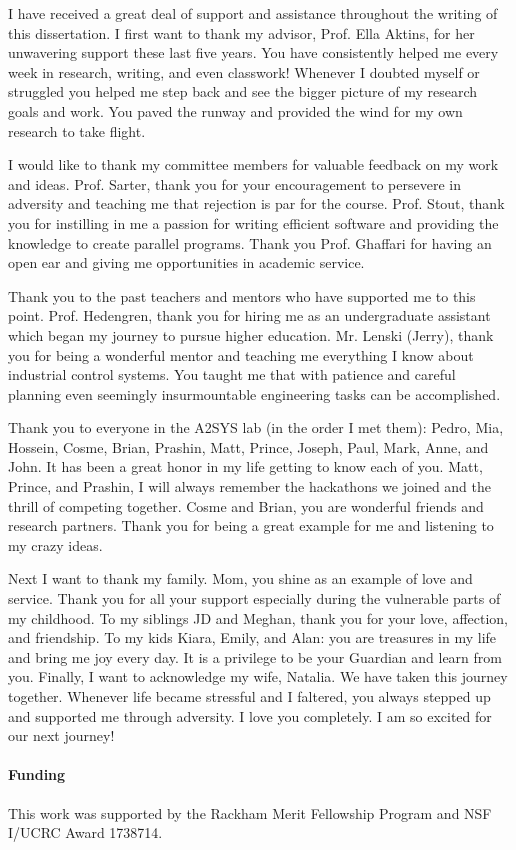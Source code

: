 I have received a great deal of support and assistance throughout the writing of this dissertation. I first want to thank my advisor, Prof. Ella Aktins, for her unwavering support these last five years. You have consistently helped me every week in research, writing, and even classwork! Whenever I doubted myself or struggled you helped me step back and see the bigger picture of my research goals and work. You paved the runway and provided the wind for my own research to take flight.

I would like to thank my committee members for valuable feedback on my work and ideas. Prof. Sarter, thank you for your encouragement to persevere in adversity and teaching me that rejection is par for the course. Prof. Stout, thank you for instilling in me a passion for writing efficient software and providing the knowledge to create parallel programs. Thank you Prof. Ghaffari for having an open ear and giving me opportunities in academic service.


Thank you to the past teachers and mentors who have supported me to this point. Prof. Hedengren, thank you for hiring me as an undergraduate assistant which began my journey to pursue higher education. Mr. Lenski (Jerry), thank you for being a wonderful mentor and teaching me everything I know about industrial control systems. You taught me that with patience and careful planning even seemingly insurmountable engineering tasks can be accomplished. 

Thank you to everyone in the A2SYS lab (in the order I met them): Pedro, Mia, Hossein, Cosme, Brian, Prashin, Matt, Prince, Joseph, Paul, Mark, Anne, and John.  It has been a great honor in my life getting to know each of you. Matt, Prince, and Prashin, I will always remember the hackathons we joined and the thrill of competing together. Cosme and Brian, you are wonderful friends and research partners. Thank you for being a great example for me and listening to my crazy ideas.

Next I want to thank my family. Mom, you shine as an example of love and service. Thank you for all your support especially during the vulnerable parts of my childhood. To my siblings JD and Meghan, thank you for your love, affection, and friendship. To my kids Kiara, Emily, and Alan: you are treasures in my life and bring me joy every day. It is a privilege to be your Guardian and learn from you.  Finally, I want to acknowledge my wife, Natalia. We have taken this journey together. Whenever life became stressful and I faltered, you always stepped up and supported me through adversity. I love you completely. I am so excited for our next journey!  


\paragraph{Funding}
This work was supported by the Rackham Merit Fellowship Program and NSF I/UCRC Award 1738714. 

